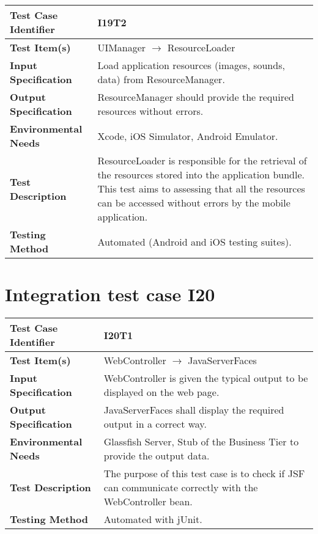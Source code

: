 \vspace{2em}

\noindent\begin{tabular}{l p{}}
    \hline
    \textbf{Test Case Identifier} & I19T2\\
    \hline
    \textbf{Test Item(s)} & UIManager $\rightarrow$ ResourceLoader \\
    \hline
    \textbf{Input Specification} & Load application resources (images, sounds, data) from ResourceManager. \\
    \hline
    \textbf{Output Specification} & ResourceManager should provide the required resources without errors. \\
    \hline
    \textbf{Environmental Needs} & Xcode, iOS Simulator, Android Emulator.\\
    \hline
    \textbf{Test Description} & ResourceLoader is responsible for the retrieval of the resources stored into the application bundle.
    This test aims to assessing that all the resources can be accessed without errors by the mobile application. \\
    \hline
    \textbf{Testing Method} & Automated (Android and iOS testing suites).\\
    \hline
\end{tabular}

\vspace{2em}

\section{Integration test case I20}

\begin{tabular}{l p{}}
    \hline
    \textbf{Test Case Identifier} & I20T1\\
    \hline
    \textbf{Test Item(s)} & WebController $\rightarrow$ JavaServerFaces \\
    \hline
    \textbf{Input Specification} & WebController is given the typical output to be displayed on the web page.\\
    \hline
    \textbf{Output Specification} & JavaServerFaces shall display the required output in a correct way.\\
    \hline
    \textbf{Environmental Needs} & Glassfish Server, Stub of the Business Tier to provide the output data. \\
    \hline
    \textbf{Test Description} & The purpose of this test case is to check if JSF can communicate correctly with the WebController bean.\\
    \hline
    \textbf{Testing Method} & Automated with jUnit. \\
    \hline
\end{tabular}

